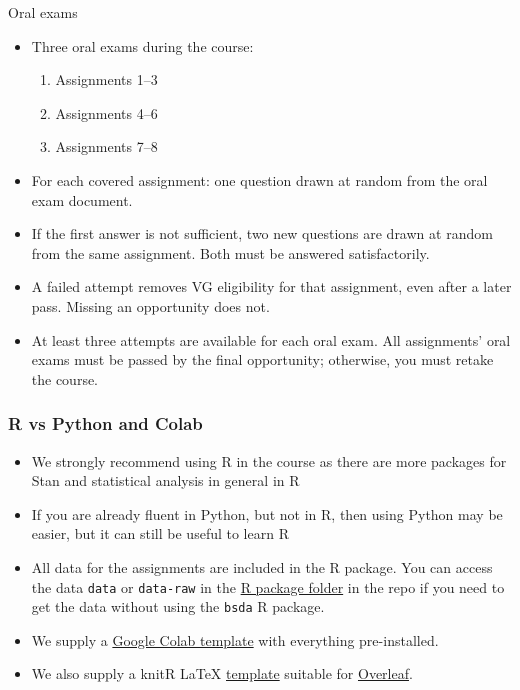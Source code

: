 \documentclass[10pt]{beamer}
\begin{document}
\begin{frame}{Oral exams}

\begin{itemize}
\item Three oral exams during the course:
\begin{enumerate}
\item Assignments 1--3
\item Assignments 4--6
\item Assignments 7--8
\end{enumerate}
\pause
\item For each covered assignment: one question drawn at random from the oral exam document.\pause
\item If the first answer is not sufficient, two new questions are drawn at random from the same assignment. Both must be answered satisfactorily.\pause
\item A failed attempt removes VG eligibility for that assignment, even after a later pass. Missing an opportunity does not.\pause
\item At least three attempts are available for each oral exam. All assignments' oral exams must be passed by the final opportunity; otherwise, you must retake the course.
\end{itemize}

\end{frame}

\begin{frame}
  \frametitle{R vs Python and Colab}

  \begin{itemize}
    \item We strongly recommend using R in the course as there are more
    packages for Stan and statistical analysis in general in R\pause
    \item If you are already fluent in Python, but not in R, then using Python may be easier, but it can still be useful to learn R\pause
    \item All data for the assignments are included in the R package. You can access the data \texttt{data} or \texttt{data-raw} in the \href{https://github.com/MansMeg/BSDA/blob/main/rpackage/}{R package folder} in the repo if you need to get the data without using the \texttt{bsda} R package.\pause
    \item We supply a \href{https://github.com/MansMeg/BSDA/blob/main/templates/bsda_colab_template.ipynb}{Google Colab template} with everything pre-installed.
    \pause
    \item We also supply a knitR \LaTeX{} \href{https://github.com/MansMeg/BSDA/blob/main/templates/assignment_template.Rtex}{template} suitable for \href{https://www.overleaf.com/}{Overleaf}.
  \end{itemize}

\end{frame}
\end{document}
